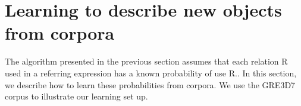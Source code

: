 \section{Learning to describe new objects from corpora}\label{sec:learning}

The algorithm presented in the previous section assumes that each relation R used in a referring expression has a known probability of use R.\puse. In this section, we describe how to learn these probabilities from corpora.  %
We use the GRE3D7 corpus to illustrate our learning set up. 


